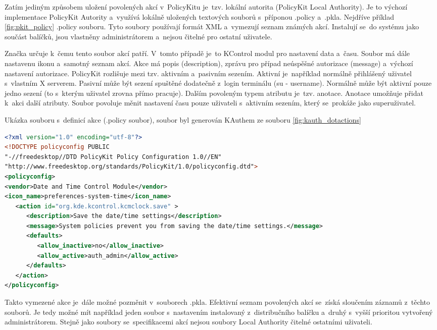 Zatím jediným způsobem uložení povolených akcí v~PolicyKitu je~tzv. lokální autorita (PolicyKit Local Authority). Je to výchozí implementace PolicyKit Autority a~využívá lokálně uložených textových souborů s~příponou .policy a~.pkla. Nejdříve příklad \ref{fig:pkit_policy} .policy souboru. Tyto soubory používají formát XML a~vymezují seznam známých akcí. Instalují se~do systému jako součást balíčků, jsou vlastněny administrátorem a~nejsou čitelné pro ostatní uživatele.

Značka  určuje k~čemu tento soubor akcí patří. V~tomto případě je~to KControl modul pro nastavení data a~času. Soubor má dále nastavenu ikonu a~samotný seznam akcí. Akce má popis (description), zprávu pro případ neúspěšné autorizace (message) a~výchozí nastavení autorizace. PolicyKit rozlišuje mezi tzv. aktivním a~pasivním sezením. Aktivní je~například normálně přihlášený uživatel s~vlastním X serverem. Pasivní může být sezení spuštěné dodatečně z~login terminálu (su - username). Normálně může být aktivní pouze jedno sezení (to s~kterým uživatel zrovna přímo pracuje). Dalším povoleným typem atributu je~tzv. anotace. Anotace umožňuje přidat k~akci další atributy. Soubor povoluje měnit nastavení času pouze uživateli s~aktivním sezením, který se~prokáže jako superuživatel.

\begin{mylisting}
\caption{Ukázka souboru s~definicí akce (.policy soubor), soubor byl generován KAuthem ze souboru \ref{fig:kauth_dotactions}}
\label{fig:pkit_policy}
\begin{lstlisting}[language=XML]
<?xml version="1.0" encoding="utf-8"?>
<!DOCTYPE policyconfig PUBLIC
"-//freedesktop//DTD PolicyKit Policy Configuration 1.0//EN"
"http://www.freedesktop.org/standards/PolicyKit/1.0/policyconfig.dtd">
<policyconfig>
<vendor>Date and Time Control Module</vendor>
<icon_name>preferences-system-time</icon_name>
   <action id="org.kde.kcontrol.kcmclock.save" >
      <description>Save the date/time settings</description>
      <message>System policies prevent you from saving the date/time settings.</message>
      <defaults>
         <allow_inactive>no</allow_inactive>
         <allow_active>auth_admin</allow_active>
      </defaults>
   </action>
</policyconfig>
\end{lstlisting}
\end{mylisting}

Takto vymezené akce je~dále možné pozměnit v~souborech .pkla. Efektivní seznam povolených akcí se~získá sloučením záznamů z~těchto souborů. Je tedy možné mít například jeden soubor s~nastavením instalovaný z~distribučního balíčku a~druhý s~vyšší prioritou vytvořený administrátorem. Stejně jako soubory se~specifikacemi akcí nejsou soubory Local Authority čitelné ostatními uživateli.

